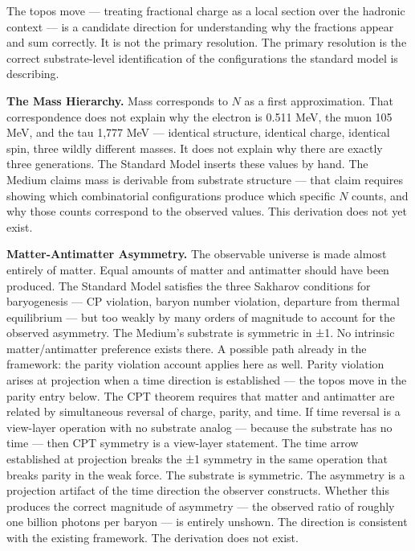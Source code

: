 \documentclass[11pt,letterpaper]{article}
\begin{document}
The topos move --- treating fractional charge as a local section over the hadronic context --- is a candidate direction for understanding why the fractions appear and sum correctly. It is not the primary resolution. The primary resolution is the correct substrate-level identification of the configurations the standard model is describing.

\textbf{The Mass Hierarchy.} Mass corresponds to \(N\) as a first approximation. That correspondence does not explain why the electron is 0.511 MeV, the muon 105 MeV, and the tau 1,777 MeV --- identical structure, identical charge, identical spin, three wildly different masses. It does not explain why there are exactly three generations. The Standard Model inserts these values by hand. The Medium claims mass is derivable from substrate structure --- that claim requires showing which combinatorial configurations produce which specific \(N\) counts, and why those counts correspond to the observed values. This derivation does not yet exist.

\textbf{Matter-Antimatter Asymmetry.} The observable universe is made almost entirely of matter. Equal amounts of matter and antimatter should have been produced. The Standard Model satisfies the three Sakharov conditions for baryogenesis --- CP violation, baryon number violation, departure from thermal equilibrium --- but too weakly by many orders of magnitude to account for the observed asymmetry. The Medium's substrate is symmetric in ±1. No intrinsic matter/antimatter preference exists there. A possible path already in the framework: the parity violation account applies here as well. Parity violation arises at projection when a time direction is established --- the topos move in the parity entry below. The CPT theorem requires that matter and antimatter are related by simultaneous reversal of charge, parity, and time. If time reversal is a view-layer operation with no substrate analog --- because the substrate has no time --- then CPT symmetry is a view-layer statement. The time arrow established at projection breaks the ±1 symmetry in the same operation that breaks parity in the weak force. The substrate is symmetric. The asymmetry is a projection artifact of the time direction the observer constructs. Whether this produces the correct magnitude of asymmetry --- the observed ratio of roughly one billion photons per baryon --- is entirely unshown. The direction is consistent with the existing framework. The derivation does not exist.
\end{document}
